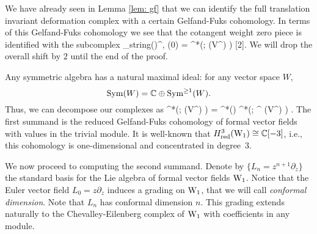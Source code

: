 

We have already seen in Lemma \ref{lem: gf} that we can identify the full translation invariant deformation complex with a certain Gelfand-Fuks cohomology. 
In terms of this Gelfand-Fuks cohomology we see that the cotangent weight zero piece is identified with the subcomplex
\ben
\Def_{\rm string}(\CC)^{\CC, \wt(0)} = \cred^*\left(\wone ; \Sym(V^\vee[z^\vee]) \right) [2]. 
\een 
We will drop the overall shift by $2$ until the end of the proof. 

Any symmetric algebra has a natural maximal ideal: 
for any vector space $W$,
\[
{\rm Sym}(W) = \mathbb C \oplus {\rm Sym}^{\geq 1}(W).
\] 
Thus, we can decompose our complexes as
\ben
 \cred^*\left(\wone ; \Sym(V^\vee[z^\vee]) \right) =   \cred^*(\wone) \oplus \clie^*\left(\wone ; \Sym^{} (V^\vee[z^\vee]) \right) .
 \een
The first summand is the reduced Gelfand-Fuks cohomology of formal vector fields with values in the trivial module.
It is well-known that $H^3_{\rm red} ({\rm W}_1) \cong \mathbb C[-3]$, 
i.e., this cohomology is one-dimensional and concentrated in degree~$3$. 

We now proceed to computing the second summand. 
Denote by $\{L_n = z^{n+1} \partial_z\}$ the standard basis for the Lie algebra of formal vector fields ${\rm W}_1$. 
Notice that the Euler vector field $L_0 = z \partial_z$ induces a grading on ${\rm W}_1$,
that we will call {\em conformal dimension}.
Note that $L_n$ has conformal dimension $n$. 
This grading extends naturally to the Chevalley-Eilenberg complex of ${\rm W}_1$ with coefficients in any module. 

